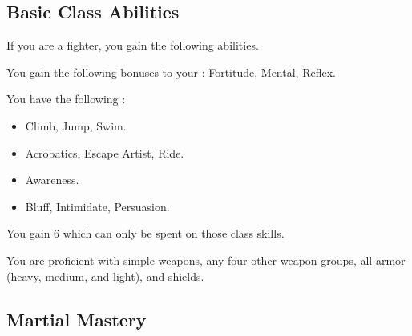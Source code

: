     \subsection{Basic Class Abilities}
        If you are a fighter, you gain the following abilities.

        You gain the following bonuses to your :  Fortitude,  Mental,  Reflex.

        You have the following :
        \begin{itemize}
            \item {} Climb, Jump, Swim.
            \item {} Acrobatics, Escape Artist, Ride.
            \item {} Awareness.
            \item {} Bluff, Intimidate, Persuasion.
        \end{itemize}
        You gain 6  which can only be spent on those class skills.

        You are proficient with simple weapons, any four other weapon groups, all armor (heavy, medium, and light), and shields.

    \subsection{Martial Mastery}

